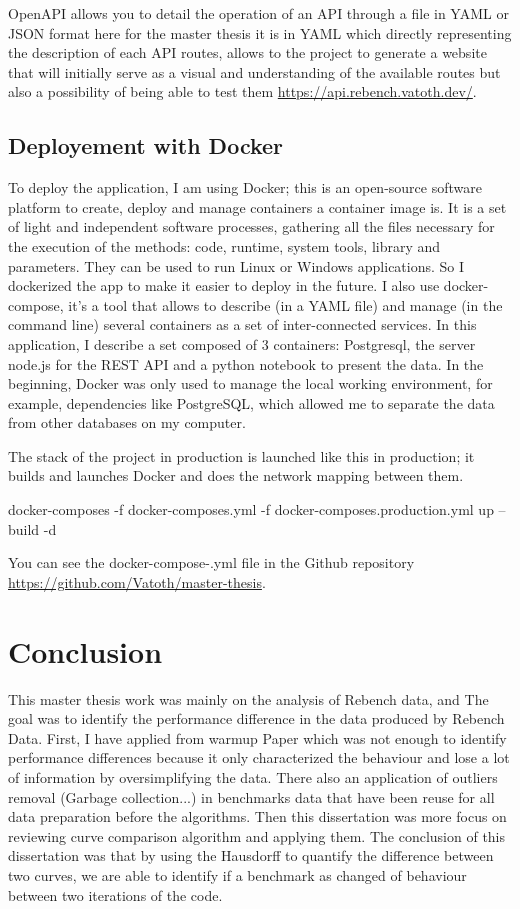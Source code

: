 \documentclass{article}
\begin{document}
OpenAPI allows you to detail the operation of an API through a file in YAML or JSON format here for the master thesis it is in YAML which directly representing the description of each API routes, allows to the project to generate a website that will initially serve as a visual and understanding of the available routes but also a possibility of being able to test them \url{https://api.rebench.vatoth.dev/}.



\subsection{Deployement with Docker}

To deploy the application, I am using Docker; this is an open-source software platform to create, deploy and manage containers a container image is. It is a set of light and independent software processes, gathering all the files necessary for the execution of the methods: code, runtime, system tools, library and parameters. They can be used to run Linux or Windows applications. So I dockerized the app to make it easier to deploy in the future. I also use docker-compose, it's a tool that allows to describe (in a YAML file) and manage (in the command line) several containers as a set of inter-connected services. In this application, I describe a set composed of 3 containers: Postgresql, the server node.js for the REST API and a python notebook to present the data. In the beginning, Docker was only used to manage the local working environment, for example, dependencies like PostgreSQL, which allowed me to separate the data from other databases on my computer.

The stack of the project in production is launched like this in production; it builds and launches Docker and does the network mapping between them.

docker-composes -f docker-composes.yml -f docker-composes.production.yml up --build -d

You can see the docker-compose-.yml file in the Github repository \url{https://github.com/Vatoth/master-thesis}. 



\section{Conclusion}


This master thesis work was mainly on the analysis of Rebench data, and The goal was to identify the performance difference in the data produced by Rebench Data. First, I have applied from \cite{barrett2017virtual} warmup Paper which was not enough to identify performance differences because it only characterized the behaviour and lose a lot of information by oversimplifying the data. There also an application of outliers removal (Garbage collection...) in benchmarks data that have been reuse for all data preparation before the algorithms.  Then this dissertation was more focus on reviewing curve comparison algorithm and applying them. The conclusion of this dissertation was that by using the Hausdorff to quantify the difference between two curves, we are able to identify if a benchmark as changed of behaviour between two iterations of the code.
\end{document}
